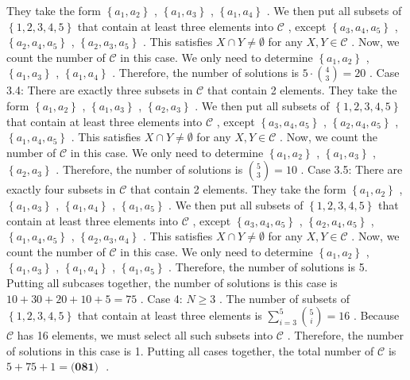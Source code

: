 \documentclass[12pt]{article}
\begin{document}
They take the form $\left\{ a_1, a_2 \right\}$ , $\left\{ a_1, a_3 \right\}$ , $\left\{ a_1, a_4 \right\}$ . We then put all subsets of $\left\{ 1, 2, 3, 4, 5 \right\}$ that contain at least three elements into $\mathcal C$ , except $\left\{ a_3, a_4, a_5 \right\}$ , $\left\{ a_2, a_4, a_5 \right\}$ , $\left\{ a_2, a_3, a_5 \right\}$ .
This satisfies $X \cap Y \neq \emptyset$ for any $X, Y \in \mathcal C$ . Now, we count the number of $\mathcal C$ in this case.
We only need to determine $\left\{ a_1, a_2 \right\}$ , $\left\{ a_1, a_3 \right\}$ , $\left\{ a_1, a_4 \right\}$ .
Therefore, the number of solutions is $5 \cdot \binom{4}{3} = 20$ . Case 3.4: There are exactly three subsets in $\mathcal C$ that contain 2 elements.
They take the form $\left\{ a_1, a_2 \right\}$ , $\left\{ a_1, a_3 \right\}$ , $\left\{ a_2, a_3 \right\}$ . We then put all subsets of $\left\{ 1, 2, 3, 4, 5 \right\}$ that contain at least three elements into $\mathcal C$ , except $\left\{ a_3, a_4, a_5 \right\}$ , $\left\{ a_2, a_4, a_5 \right\}$ , $\left\{ a_1, a_4, a_5 \right\}$ .
This satisfies $X \cap Y \neq \emptyset$ for any $X, Y \in \mathcal C$ . Now, we count the number of $\mathcal C$ in this case.
We only need to determine $\left\{ a_1, a_2 \right\}$ , $\left\{ a_1, a_3 \right\}$ , $\left\{ a_2, a_3 \right\}$ .
Therefore, the number of solutions is $\binom{5}{3} = 10$ . Case 3.5: There are exactly four subsets in $\mathcal C$ that contain 2 elements.
They take the form $\left\{ a_1, a_2 \right\}$ , $\left\{ a_1, a_3 \right\}$ , $\left\{ a_1, a_4 \right\}$ , $\left\{ a_1, a_5 \right\}$ . We then put all subsets of $\left\{ 1, 2, 3, 4, 5 \right\}$ that contain at least three elements into $\mathcal C$ , except $\left\{ a_3, a_4, a_5 \right\}$ , $\left\{ a_2, a_4, a_5 \right\}$ , $\left\{ a_1, a_4, a_5 \right\}$ , $\left\{ a_2, a_3, a_4 \right\}$ .
This satisfies $X \cap Y \neq \emptyset$ for any $X, Y \in \mathcal C$ . Now, we count the number of $\mathcal C$ in this case.
We only need to determine $\left\{ a_1, a_2 \right\}$ , $\left\{ a_1, a_3 \right\}$ , $\left\{ a_1, a_4 \right\}$ , $\left\{ a_1, a_5 \right\}$ .
Therefore, the number of solutions is 5. Putting all subcases together, the number of solutions is this case is $10 + 30 + 20 + 10 + 5 = 75$ . Case 4: $N \geq 3$ . The number of subsets of $\left\{ 1, 2, 3, 4, 5 \right\}$ that contain at least three elements is $\sum_{i=3}^5 \binom{5}{i} = 16$ .
Because $\mathcal C$ has 16 elements, we must select all such subsets into $\mathcal C$ .
Therefore, the number of solutions in this case is 1. Putting all cases together, the total number of $\mathcal C$ is $5 + 75 + 1 = \boxed{\textbf{(081) }}$ .
\end{document}
